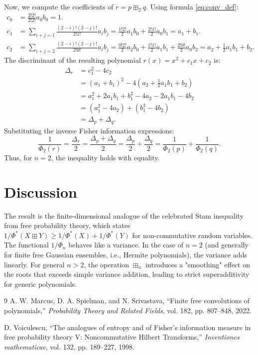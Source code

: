 \documentclass[12pt]{article}
\begin{document}
Now, we compute the coefficients of $r = p \boxplus_2 q$. Using formula \eqref{eq:conv_def}:
\begin{align*}
c_0 &= \frac{2! 2!}{2! 2!} a_0 b_0 = 1. \\
c_1 &= \sum_{i+j=1} \frac{(2-i)! (2-j)!}{2! 1!} a_i b_j = \frac{1! 2!}{2} a_1 b_0 + \frac{2! 1!}{2} a_0 b_1 = a_1 + b_1. \\
c_2 &= \sum_{i+j=2} \frac{(2-i)! (2-j)!}{2! 0!} a_i b_j = \frac{0! 2!}{2} a_2 b_0 + \frac{1! 1!}{2} a_1 b_1 + \frac{2! 0!}{2} a_0 b_2 = a_2 + \frac{1}{2} a_1 b_1 + b_2.
\end{align*}
The discriminant of the resulting polynomial $r(x) = x^2 + c_1 x + c_2$ is:
\begin{align*}
\Delta_r &= c_1^2 - 4c_2 \\
&= (a_1 + b_1)^2 - 4\left( a_2 + \frac{1}{2} a_1 b_1 + b_2 \right) \\
&= a_1^2 + 2a_1 b_1 + b_1^2 - 4a_2 - 2a_1 b_1 - 4b_2 \\
&= (a_1^2 - 4a_2) + (b_1^2 - 4b_2) \\
&= \Delta_p + \Delta_q.
\end{align*}
Substituting the inverse Fisher information expressions:
\[
\frac{1}{\Phi_2(r)} = \frac{\Delta_r}{2} = \frac{\Delta_p + \Delta_q}{2} = \frac{\Delta_p}{2} + \frac{\Delta_q}{2} = \frac{1}{\Phi_2(p)} + \frac{1}{\Phi_2(q)}.
\]
Thus, for $n=2$, the inequality holds with equality.

\section{Discussion}

The result is the finite-dimensional analogue of the celebrated Stam inequality from free probability theory, which states $1/\Phi^*(X \boxplus Y) \ge 1/\Phi^*(X) + 1/\Phi^*(Y)$ for non-commutative random variables. The functional $1/\Phi_n$ behaves like a variance. In the case of $n=2$ (and generally for finite free Gaussian ensembles, i.e., Hermite polynomials), the variance adds linearly. For general $n > 2$, the operation $\boxplus_n$ introduces a "smoothing" effect on the roots that exceeds simple variance addition, leading to strict superadditivity for generic polynomials.

\begin{thebibliography}{9}
A. W. Marcus, D. A. Spielman, and N. Srivastava, ``Finite free convolutions of polynomials,'' \textit{Probability Theory and Related Fields}, vol. 182, pp. 807--848, 2022.

D. Voiculescu, ``The analogues of entropy and of Fisher's information measure in free probability theory V: Noncommutative Hilbert Transforms,'' \textit{Inventiones mathematicae}, vol. 132, pp. 189--227, 1998.
\end{thebibliography}
\end{document}
